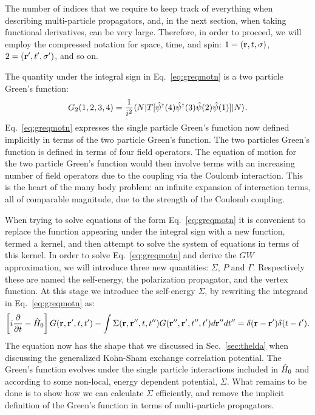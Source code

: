 The number of indices that we require to keep track of everything when 
describing multi-particle propagators, and, in the next section, 
when taking functional derivatives, can be very large. 
Therefore, in order to proceed, we will employ the compressed notation for space, 
time, and spin: $1 = ({\bf r},t,\sigma)$, $2=({\bf r}',t',\sigma')$, and so on.

The quantity under the integral sign in Eq.~\ref{eq:greqmotn} is a two particle Green's function:
%
\begin{equation}
\label{eq:2pgreenfxn}
G_{2}(1,2,3,4) = \frac{1}{i^{2}} \langle N|T[\hat{\psi}^{\dagger}(4)\hat{\psi}^{\dagger}(3)\hat{\psi}(2)\hat{\psi}(1)]|N\rangle.
\end{equation}
%
Eq.~\ref{eq:greqmotn} expresses the single particle Green's function now defined 
implicitly in terms of the two particle Green's function. The two particles Green's function is 
defined in terms of  four field operators. The equation of motion for the two particle Green's 
function would then involve terms with an increasing number of field operators due to the coupling 
via the Coulomb interaction.
This is the heart of the many body problem: an infinite expansion of interaction terms,
all of comparable magnitude, due to the strength of the Coulomb coupling.

When trying to solve equations of the form Eq.~\ref{eq:greqmotn} it is convenient to 
replace the function appearing under the integral sign with a new function,
termed a kernel, and then attempt to solve the system of equations in terms of this kernel.
In order to solve Eq.~\ref{eq:greqmotn} and derive the $GW$ approximation,
we will introduce three new quantities: $\Sigma$, $P$ and $\Gamma$.
Respectively these are named the self-energy, the polarization propagator, and the vertex function.
At this stage we introduce the self-energy $\Sigma$, by rewriting the integrand in Eq.~\ref{eq:greqmotn} as:
%
\begin{equation}
\label{eq:greqmsig}
\left[i\frac{\partial}{\partial t} - \hat{H}_{0}\right]G({\bf r},{\bf r}',t,t') - \int \Sigma({\bf r},{\bf r}'',t,t'')G({\bf r}'',{\bf r^\prime},t'',t')d{\bf r}''dt'' =  \delta({\bf r}-{\bf r^\prime})\delta(t-t').
\end{equation}
%
The equation now has the shape that we discussed in Sec.~\ref{sec:thelda} when discussing
the generalized Kohn-Sham exchange correlation potential. The Green's 
function evolves under the single particle
interactions included in $\hat{H}_{0}$ and according to some non-local, energy dependent potential, $\Sigma$.
What remains to be done is to show how we can calculate $\Sigma$ efficiently, and remove the 
implicit definition of the Green's function in terms of multi-particle propagators.

